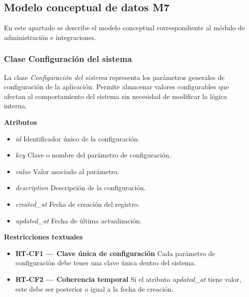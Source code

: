 \subsection{Modelo conceptual de datos M7}

En este apartado se describe el modelo conceptual correspondiente al módulo de administración e integraciones.


\subsubsection{Clase Configuración del sistema}

La clase \textit{Configuración del sistema} representa los parámetros generales de configuración de la aplicación. Permite almacenar valores configurables que afectan al comportamiento del sistema sin necesidad de modificar la lógica interna.

\textbf{Atributos}

\begin{itemize}

      \item \textit{id}
            Identificador único de la configuración.
      \item \textit{key}
            Clave o nombre del parámetro de configuración.
      \item \textit{value}
            Valor asociado al parámetro.
      \item \textit{description}
            Descripción de la configuración.
      \item \textit{created\_at}
            Fecha de creación del registro.
      \item \textit{updated\_at}
            Fecha de última actualización.

\end{itemize}

\textbf{Restricciones textuales}

\begin{itemize}

      \item \textbf{RT-CF1 — Clave única de configuración}
            Cada parámetro de configuración debe tener una clave única dentro del sistema.
      \item \textbf{RT-CF2 — Coherencia temporal}
            Si el atributo \textit{updated\_at} tiene valor, este debe ser posterior o igual a la fecha de creación.

\end{itemize}

